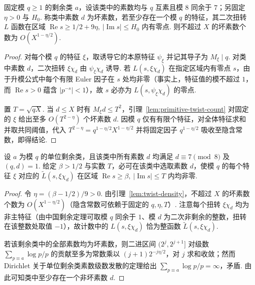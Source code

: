 \begin{lemma}[固定模数下的坏素数密度]
\label{lem:twist-density}
\emitthmsource
固定模 $q\ge1$ 的剩余类 $a$，设该类中的素数均与 $q$ 互素且模 $8$ 同余于 $7$；另固定 $\eta>0$ 与 $H_0$. 称类中素数 $d$ 为坏素数，若至少存在一个模 $q$ 的特征，其二次扭转 $L$ 函数在区域 $\operatorname{Re}s\ge1/2+9\eta,\ |\operatorname{Im}s|\le H_0$ 内有零点. 则不超过 $X$ 的坏素数个数为 $O(X^{1-\eta/2})$.
\end{lemma}
\begin{proof}
对每个模 $q$ 的特征 $\xi$，取诱导它的本原特征 $\psi_\xi$ 并记其导子为 $M_\xi\mid q$. 对类中素数 $d$，二次扭转 $\xi\chi_d$ 由 $\psi_\xi\chi_d$ 诱导. 若 $L(s,\xi\chi_d)$ 在指定区域内有零点 $s$，由于升模公式中每个有限 Euler 因子在 $s$ 处均非零（事实上，特征值的模不超过 $1$，而 $\operatorname{Re}s>0$ 蕴含 $|p^{-s}|<1$），故 $s$ 必亦为 $L(s,\psi_\xi\chi_d)$ 的零点.

置 $T=\sqrt{qX}$. 当 $d\le X$ 时有 $M_\xi d\le T^2$，引理~\ref{lem:primitive-twist-count} 对固定的 $\xi$ 给出至多 $O(T^{2-\eta})$ 个坏素数 $d$. 因模 $q$ 仅有有限个特征，对全体特征求和并取共同阈值，代入 $T^{2-\eta}=q^{1-\eta/2}X^{1-\eta/2}$ 并将固定因子 $q^{1-\eta/2}$ 吸收至隐含常数，即得结论.
\end{proof}

\begin{lemma}[选取在给定区域无零点的二次扭转]
\label{lem:twist-choice}
\emitthmsource
设 $a$ 为模 $q$ 的单位剩余类，且该类中所有素数 $d$ 均满足 $d\equiv7\pmod8$ 及 $(q,d)=1$. 给定 $\beta>1/2$ 与实数 $T$，必可在该类中选取素数 $d$，使模 $q$ 的每个特征 $\xi$ 对应的 $\widetilde L(s,\xi\chi_d)$ 在区域 $\operatorname{Re}s\ge\beta,\ |\operatorname{Im}s|\le T$ 内均非零.
\end{lemma}
\begin{proof}
令 $\eta=(\beta-1/2)/9>0$. 由引理~\ref{lem:twist-density}，不超过 $X$ 的坏素数个数为 $O(X^{1-\eta/2})$（隐含常数可依赖于固定的 $q,\eta,T$）. 注意每个扭转 $\xi\chi_d$ 均为非主特征（由中国剩余定理可取模 $q$ 同余于 $1$、模 $d$ 为二次非剩余的整数，扭转在该整数处取值 $-1$），故计数中的 $L(s,\xi\chi_d)$ 恰为整函数 $\widetilde L(s,\xi\chi_d)$.

若该剩余类中的全部素数均为坏素数，则二进区间 $(2^j,2^{j+1}]$ 对级数 $\sum_{p\equiv a}\log p/p$ 的贡献至多为常数乘以 $(j+1)2^{-j\eta/2}$，对 $j$ 求和收敛；然而 Dirichlet 关于单位剩余类素数级数发散的定理给出 $\sum_{p\equiv a}\log p/p=\infty$，矛盾. 由此可知类中至少存在一个非坏素数 $d$.
\end{proof}

